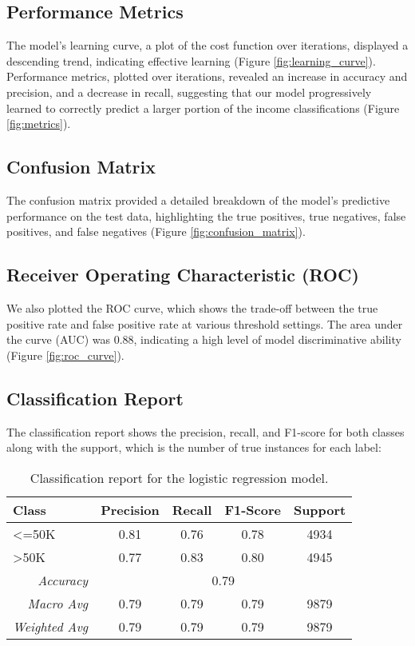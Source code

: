 \documentclass[12pt]{article}
\begin{document}
\subsection{Performance Metrics}
The model's learning curve, a plot of the cost function over iterations, displayed a descending trend, indicating effective learning (Figure \ref{fig:learning_curve}). Performance metrics, plotted over iterations, revealed an increase in accuracy and precision, and a decrease in recall, suggesting that our model progressively learned to correctly predict a larger portion of the income classifications (Figure \ref{fig:metrics}).

\subsection{Confusion Matrix}
The confusion matrix provided a detailed breakdown of the model's predictive performance on the test data, highlighting the true positives, true negatives, false positives, and false negatives (Figure \ref{fig:confusion_matrix}).

\subsection{Receiver Operating Characteristic (ROC)}
We also plotted the ROC curve, which shows the trade-off between the true positive rate and false positive rate at various threshold settings. The area under the curve (AUC) was 0.88, indicating a high level of model discriminative ability (Figure \ref{fig:roc_curve}).

\subsection{Classification Report}
The classification report shows the precision, recall, and F1-score for both classes along with the support, which is the number of true instances for each label:

\begin{table}[H]
\centering
\begin{tabular}{|l|c|c|c|c|}
\hline
\textbf{Class} & \textbf{Precision} & \textbf{Recall} & \textbf{F1-Score} & \textbf{Support} \\ \hline
<=50K & 0.81 & 0.76 & 0.78 & 4934 \\ \hline
>50K & 0.77 & 0.83 & 0.80 & 4945 \\ \hline
\multicolumn{1}{|r|}{\textit{Accuracy}} & \multicolumn{4}{c|}{0.79} \\ \hline
\multicolumn{1}{|r|}{\textit{Macro Avg}} & 0.79 & 0.79 & 0.79 & 9879 \\ \hline
\multicolumn{1}{|r|}{\textit{Weighted Avg}} & 0.79 & 0.79 & 0.79 & 9879 \\ \hline
\end{tabular}
\caption{Classification report for the logistic regression model.}
\label{tab:classification_report}
\end{table}
\end{document}
